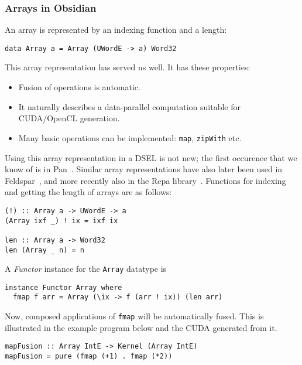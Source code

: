 \subsubsection{Arrays in Obsidian}

An array is represented by an indexing function and a length:
\begin{codesize} 
\begin{verbatim}
data Array a = Array (UWordE -> a) Word32 
\end{verbatim}
\end{codesize}
This array representation has served us well. It has these properties:
\begin{itemize} 
\item Fusion of operations is automatic.
\item It naturally describes a data-parallel computation suitable for CUDA/OpenCL generation.
\item Many basic operations can be implemented: {\tt map}, {\tt zipWith} etc.
\end{itemize}
Using this array representation in a DSEL is not new; the first occurence that we know of is in
Pan~. Similar array representations have also later been 
used in Feldspar~, and more recently also in the Repa library~.
Functions for indexing and getting the length of arrays are as follows:
\begin{codesize} 
\begin{verbatim}
(!) :: Array a -> UWordE -> a 
(Array ixf _) ! ix = ixf ix 

len :: Array a -> Word32
len (Array _ n) = n 
\end{verbatim}
\end{codesize}
A {\em Functor} instance for the {\tt Array} datatype is
\begin{codesize} 
\begin{verbatim}
instance Functor Array where 
  fmap f arr = Array (\ix -> f (arr ! ix)) (len arr) 
\end{verbatim}
\end{codesize}
Now, composed applications of {\tt fmap} will be automatically fused. This is 
illustrated in the example program below and the CUDA generated
from it.  
\begin{codesize} 
\begin{verbatim}
mapFusion :: Array IntE -> Kernel (Array IntE) 
mapFusion = pure (fmap (+1) . fmap (*2)) 
\end{verbatim}
\end{codesize}

